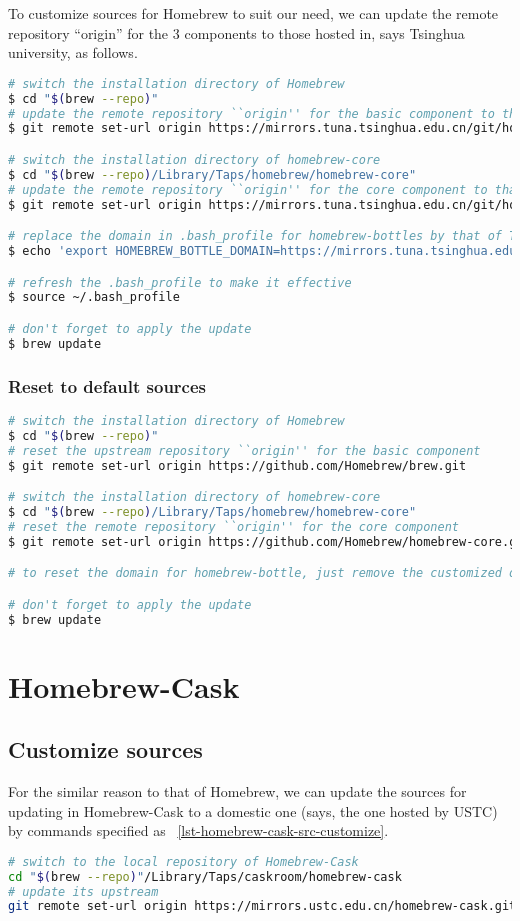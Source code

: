 \documentclass[a4paper,10pt]{report}
\begin{document}
To customize sources for Homebrew to suit our need, we can update the remote repository ``origin'' for the 3 components to those hosted in, says Tsinghua university, as follows.
\begin{lstlisting}[language=bash]
# switch the installation directory of Homebrew
$ cd "$(brew --repo)"
# update the remote repository ``origin'' for the basic component to that of Tsinghua
$ git remote set-url origin https://mirrors.tuna.tsinghua.edu.cn/git/homebrew/brew.git

# switch the installation directory of homebrew-core
$ cd "$(brew --repo)/Library/Taps/homebrew/homebrew-core"
# update the remote repository ``origin'' for the core component to that of Tsinghua 
$ git remote set-url origin https://mirrors.tuna.tsinghua.edu.cn/git/homebrew/homebrew-core.git

# replace the domain in .bash_profile for homebrew-bottles by that of Tsinghua
$ echo 'export HOMEBREW_BOTTLE_DOMAIN=https://mirrors.tuna.tsinghua.edu.cn/homebrew-bottles' >> ~/.bash_profile

# refresh the .bash_profile to make it effective
$ source ~/.bash_profile

# don't forget to apply the update
$ brew update
\end{lstlisting}
\subsubsection{Reset to default sources}
\begin{lstlisting}[language=bash]
# switch the installation directory of Homebrew
$ cd "$(brew --repo)"
# reset the upstream repository ``origin'' for the basic component
$ git remote set-url origin https://github.com/Homebrew/brew.git

# switch the installation directory of homebrew-core
$ cd "$(brew --repo)/Library/Taps/homebrew/homebrew-core"
# reset the remote repository ``origin'' for the core component
$ git remote set-url origin https://github.com/Homebrew/homebrew-core.git

# to reset the domain for homebrew-bottle, just remove the customized one from .bash_profile

# don't forget to apply the update
$ brew update
\end{lstlisting}
\section{Homebrew-Cask}
\subsection{Customize sources}
For the similar reason to that of Homebrew, we can update the sources for updating in Homebrew-Cask to a domestic one (says, the one hosted by USTC) by commands specified as \lstlistingname~\ref{lst-homebrew-cask-src-customize}.
\begin{lstlisting}[language=bash,caption={Customize sources for Homebrew-Cask},label={lst-homebrew-cask-src-customize}]
# switch to the local repository of Homebrew-Cask
cd "$(brew --repo)"/Library/Taps/caskroom/homebrew-cask
# update its upstream
git remote set-url origin https://mirrors.ustc.edu.cn/homebrew-cask.git
\end{lstlisting}
\end{document}
